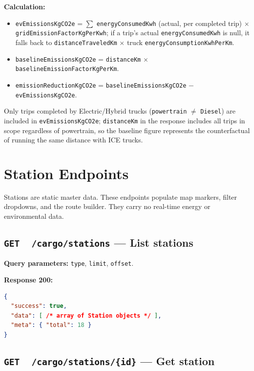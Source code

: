\documentclass{article}
\newcommand{\GET}{\colorbox{evblue!20}{\texttt{\textbf{\color{evblue}GET}}}}
\begin{document}
\noindent\textbf{Calculation:}
\begin{itemize}[leftmargin=*]
    \item \texttt{evEmissionsKgCO2e} = $\sum$ \texttt{energyConsumedKwh} (actual, per
          completed trip) $\times$ \texttt{gridEmissionFactorKgPerKwh}; if a trip's
          actual \texttt{energyConsumedKwh} is null, it falls back to
          \texttt{distanceTraveledKm} $\times$ truck \texttt{energyConsumptionKwhPerKm}.
    \item \texttt{baselineEmissionsKgCO2e} = \texttt{distanceKm} $\times$
          \texttt{baselineEmissionFactorKgPerKm}.
    \item \texttt{emissionReductionKgCO2e} = \texttt{baselineEmissionsKgCO2e} $-$
          \texttt{evEmissionsKgCO2e}.
\end{itemize}

\noindent Only trips completed by Electric/Hybrid trucks (\texttt{powertrain} $\neq$
\texttt{Diesel}) are included in \texttt{evEmissionsKgCO2e}; \texttt{distanceKm} in the
response includes all trips in scope regardless of powertrain, so the baseline figure
represents the counterfactual of running the same distance with ICE trucks.

\newpage

\section{Station Endpoints}

Stations are static master data. These endpoints populate map markers, filter
dropdowns, and the route builder. They carry no real-time energy or
environmental data.

\subsection{\GET\ \ \texttt{/cargo/stations} --- List stations}

\textbf{Query parameters:} \texttt{type}, \texttt{limit}, \texttt{offset}.

\textbf{Response 200:}
\begin{lstlisting}[language=json]
{
  "success": true,
  "data": [ /* array of Station objects */ ],
  "meta": { "total": 18 }
}
\end{lstlisting}

\subsection{\GET\ \ \texttt{/cargo/stations/\{id\}} --- Get station}
\end{document}
